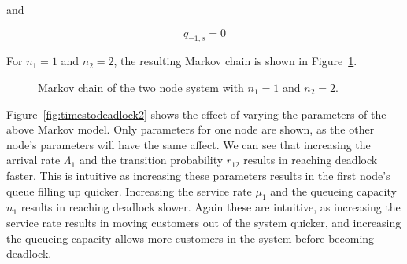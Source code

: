 \documentclass{article}
\begin{document}
and

\begin{equation}
  q_{-1, s} = 0
\end{equation}

For $n_1 = 1$ and $n_2 = 2$, the resulting Markov chain is shown in Figure~\ref{fig:2nodeMC}.

\begin{figure}[H]
    
    \caption{Markov chain of the two node system with $n_1=1$ and $n_2=2$.}
    \label{fig:2nodeMC}
\end{figure}

Figure~\ref{fig:timestodeadlock2} shows the effect of varying the parameters of the above Markov model.
Only parameters for one node are shown, as the other node's parameters will have the same affect.
We can see that increasing the arrival rate $\Lambda_1$ and the transition probability $r_{12}$ results in reaching deadlock faster.
This is intuitive as increasing these parameters results in the first node's queue filling up quicker.
Increasing the service rate $\mu_1$ and the queueing capacity $n_1$ results in reaching deadlock slower.
Again these are intuitive, as increasing the service rate results in moving customers out of the system quicker, and increasing the queueing capacity allows more customers in the system before becoming deadlock.
\end{document}
